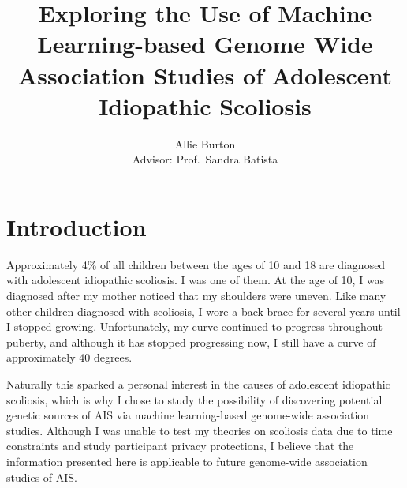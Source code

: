 \documentclass[12pt]{report}
\begin{document}
\title{Exploring the Use of Machine Learning-based Genome Wide Association Studies 
of Adolescent Idiopathic Scoliosis}

\author{Allie Burton\\Advisor: Prof.\ Sandra Batista}

\date{}
\maketitle

\doublespacing

\tableofcontents



\chapter{Introduction}
Approximately 4\% of all children between the ages of 10 and 18 are diagnosed with
adolescent idiopathic scoliosis\cite{ScoliosisResearchSociety}. I was one of them. 
At the age of 10, I was diagnosed after my mother noticed that my shoulders were 
uneven. Like many other children diagnosed with scoliosis, I wore a back brace 
for several years until I stopped growing. Unfortunately, my curve continued to
progress throughout puberty, and although it has stopped progressing now, I still
have a curve of approximately 40 degrees.

Naturally this sparked a personal interest in the causes of adolescent idiopathic
scoliosis, which is why I chose to study the possibility of discovering potential 
genetic sources of AIS via machine learning-based genome-wide association studies.
Although I was unable to test my theories on scoliosis data due to time constraints
and study participant privacy protections, I believe that the information presented
here is applicable to future genome-wide association studies of AIS.
\end{document}
